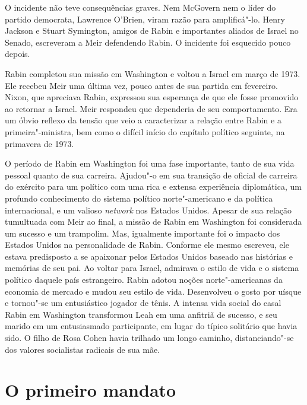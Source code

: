 O incidente não teve consequências graves. Nem McGovern nem o líder do
partido democrata, Lawrence O'Brien, viram razão para amplificá"-lo.
Henry Jackson e Stuart Symington, amigos de Rabin e importantes aliados
de Israel no Senado, escreveram a Meir defendendo Rabin. O incidente foi
esquecido pouco depois.

Rabin completou sua missão em Washington e voltou a Israel em março de
1973. Ele recebeu Meir uma última vez, pouco antes de sua partida em
fevereiro. Nixon, que apreciava Rabin, expressou sua esperança de que
ele fosse promovido ao retornar a Israel. Meir respondeu que dependeria
de seu comportamento. Era um óbvio reflexo da tensão que veio a
caracterizar a relação entre Rabin e a primeira"-ministra, bem como o difícil
início do capítulo político seguinte, na primavera de 1973.

O período de Rabin em Washington foi uma fase importante, tanto de sua
vida pessoal quanto de sua carreira. Ajudou"-o em sua transição de
oficial de carreira do exército para um político com uma rica e extensa
experiência diplomática, um profundo conhecimento do sistema político
norte"-americano e da política internacional, e um valioso \textit{network}
nos Estados Unidos. Apesar de sua relação tumultuada com Meir ao final,
a missão de Rabin em Washington foi considerada um sucesso e um
trampolim. Mas, igualmente importante foi o impacto dos Estados Unidos
na personalidade de Rabin. Conforme ele mesmo escreveu, ele estava
predisposto a se apaixonar pelos Estados Unidos baseado nas histórias e
memórias de seu pai. Ao voltar para Israel, admirava o estilo de vida e o
sistema político daquele país estrangeiro. Rabin adotou noções norte"-americanas da
economia de mercado e mudou seu estilo de vida. Desenvolveu o gosto por
uísque e tornou"-se um entusiástico jogador de tênis. A intensa vida
social do casal Rabin em Washington transformou Leah em uma anfitriã de
sucesso, e seu marido em um entusiasmado participante, em lugar do típico
solitário que havia sido. O filho de Rosa Cohen havia trilhado um longo
caminho, distanciando"-se dos valores socialistas radicais de sua mãe.

\chapter*{O primeiro mandato\smallskip{}}

